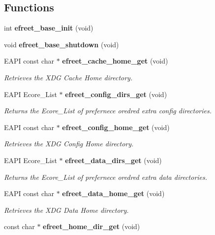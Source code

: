 \subsection*{Functions}
\begin{CompactItemize}
\item 
int {\bf efreet\_\-base\_\-init} (void)
\item 
void {\bf efreet\_\-base\_\-shutdown} (void)
\item 
EAPI const char $\ast$ {\bf efreet\_\-cache\_\-home\_\-get} (void)
\begin{CompactList}\small\item\em Retrieves the XDG Cache Home directory. \item\end{CompactList}\item 
EAPI Ecore\_\-List $\ast$ {\bf efreet\_\-config\_\-dirs\_\-get} (void)
\begin{CompactList}\small\item\em Returns the Ecore\_\-List of prefernece oredred extra config directories. \item\end{CompactList}\item 
EAPI const char $\ast$ {\bf efreet\_\-config\_\-home\_\-get} (void)
\begin{CompactList}\small\item\em Retrieves the XDG Config Home directory. \item\end{CompactList}\item 
EAPI Ecore\_\-List $\ast$ {\bf efreet\_\-data\_\-dirs\_\-get} (void)
\begin{CompactList}\small\item\em Returns the Ecore\_\-List of prefernece oredred extra data directories. \item\end{CompactList}\item 
EAPI const char $\ast$ {\bf efreet\_\-data\_\-home\_\-get} (void)
\begin{CompactList}\small\item\em Retrieves the XDG Data Home directory. \item\end{CompactList}\item 
const char $\ast$ {\bf efreet\_\-home\_\-dir\_\-get} (void)
\end{CompactItemize}
